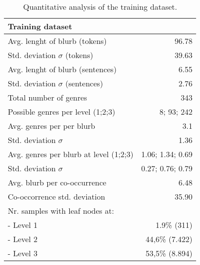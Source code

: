 \documentclass[11pt]{article}
\begin{document}

\begin{table}
\small
\begin{center}
\begin{tabular}{|l|r|}
\hline\centering\textbf{Training dataset}  &                    \\
\hline
Avg. lenght of blurb (tokens)              &  96.78             \\
Std. deviation $\sigma$ (tokens)           &  39.63             \\
Avg. lenght of blurb (sentences)           &  6.55              \\
Std. deviation $\sigma$ (sentences)        &  2.76              \\
\hline
Total number of genres                     &  343               \\
Possible genres per level (1;2;3)          &  8; 93; 242        \\
Avg. genres per per blurb                  &  3.1               \\
Std. deviation $\sigma$                    &  1.36              \\
Avg. genres per blurb at level (1;2;3)     &  1.06; 1.34; 0.69  \\
Std. deviation $\sigma$                    &  0.27; 0.76; 0.79  \\
\hline
Avg. blurb per co-occurrence               &  6.48              \\
Co-occorrence std. deviation               & 35.90              \\
\hline
Nr. samples with leaf nodes at:            &                    \\
 - Level 1                                 & 1.9\% (311)        \\
 - Level 2                                 & 44,6\% (7.422)     \\
 - Level 3                                 & 53,5\% (8.894)     \\
\hline
\end{tabular}
\end{center}
\caption{\label{quantitivy-analysis-train}Quantitative analysis of the training dataset.}
\end{table}
\end{document}
